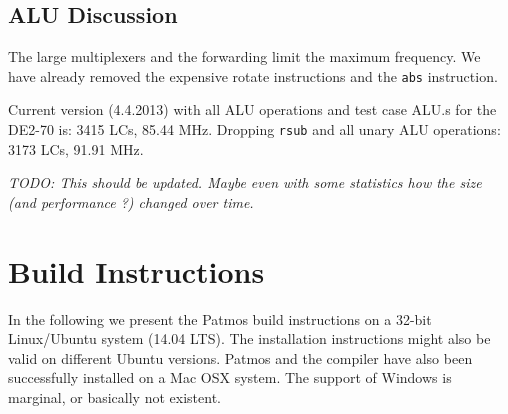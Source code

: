 \documentclass[a4paper,fontsize=10pt,twoside,DIV15,BCOR12mm,headinclude=true,footinclude=false,pagesize,bibtotoc]{scrbook}
\newcommand{\code}[1]{{\texttt{#1}}}
\newcommand{\todo}[1]{{\emph{TODO: #1}}}
\begin{document}
\section{ALU Discussion}

The large multiplexers and the forwarding limit the maximum frequency.
We have already removed the expensive rotate instructions and the
\code{abs} instruction.

Current version (4.4.2013) with all ALU operations and test case ALU.s
for the DE2-70 is: 3415 LCs, 85.44 MHz. Dropping \code{rsub} and all unary
ALU operations: 3173 LCs, 91.91 MHz.

\todo{This should be updated. Maybe even with some statistics how the size
(and performance ?) changed over time.}


\chapter{Build Instructions}
\label{ch:build_instructions}

In the following we present the Patmos build instructions on a 32-bit Linux/Ubuntu
system (14.04 LTS).%
The installation instructions might also be valid on different Ubuntu versions.
Patmos and the compiler have also been successfully installed on a Mac OSX
system.  The support of Windows is marginal, or basically not existent.
\end{document}
